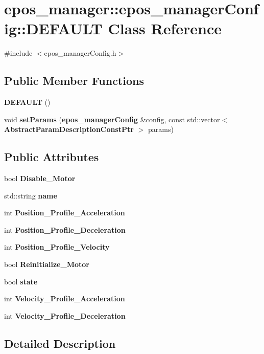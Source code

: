 \section{epos\-\_\-manager\-:\-:epos\-\_\-manager\-Config\-:\-:\-D\-E\-F\-A\-U\-L\-T \-Class \-Reference}
\label{classepos__manager_1_1epos__managerConfig_1_1DEFAULT}


{\ttfamily \#include $<$epos\-\_\-manager\-Config.\-h$>$}

\subsection*{\-Public \-Member \-Functions}
\begin{DoxyCompactItemize}
\item 
{\bf \-D\-E\-F\-A\-U\-L\-T} ()
\item 
void {\bf set\-Params} ({\bf epos\-\_\-manager\-Config} \&config, const std\-::vector$<$ {\bf \-Abstract\-Param\-Description\-Const\-Ptr} $>$ params)
\end{DoxyCompactItemize}
\subsection*{\-Public \-Attributes}
\begin{DoxyCompactItemize}
\item 
bool {\bf \-Disable\-\_\-\-Motor}
\item 
std\-::string {\bf name}
\item 
int {\bf \-Position\-\_\-\-Profile\-\_\-\-Acceleration}
\item 
int {\bf \-Position\-\_\-\-Profile\-\_\-\-Deceleration}
\item 
int {\bf \-Position\-\_\-\-Profile\-\_\-\-Velocity}
\item 
bool {\bf \-Reinitialize\-\_\-\-Motor}
\item 
bool {\bf state}
\item 
int {\bf \-Velocity\-\_\-\-Profile\-\_\-\-Acceleration}
\item 
int {\bf \-Velocity\-\_\-\-Profile\-\_\-\-Deceleration}
\end{DoxyCompactItemize}


\subsection{\-Detailed \-Description}


